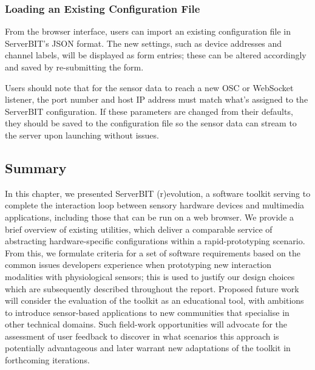 \subsubsection*{Loading an Existing Configuration File}

From the browser interface, users can import an existing configuration file in ServerBIT's JSON format. The new settings, such as device addresses and channel labels, will be displayed as form entries; these can be altered accordingly and saved by re-submitting the form.

Users should note that for the sensor data to reach a new OSC or WebSocket listener, the port number and host IP address must match what's assigned to the ServerBIT configuration. If these parameters are changed from their defaults, they should be saved to the configuration file so the sensor data can stream to the server upon launching without issues.

\subsection{Summary}

In this chapter, we presented ServerBIT (r)evolution, a software toolkit serving to complete the interaction loop between sensory hardware devices and multimedia applications, including those that can be run on a web browser. We provide a brief overview of existing utilities, which deliver a comparable service of abstracting hardware-specific configurations within a rapid-prototyping scenario. From this, we formulate criteria for a set of software requirements based on the common issues developers experience when prototyping new interaction modalities with physiological sensors; this is used to justify our design choices which are subsequently described throughout the report.
Proposed future work will consider the evaluation of the toolkit as an educational tool, with ambitions to introduce sensor-based applications to new communities that specialise in other technical domains. Such field-work opportunities will advocate for the assessment of user feedback to discover in what scenarios this approach is potentially advantageous and later warrant new adaptations of the toolkit in forthcoming iterations.
